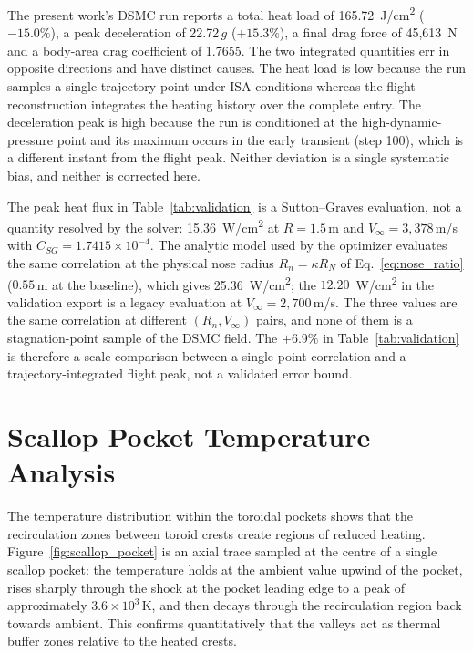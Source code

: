 The present work's DSMC run reports a total heat load of 165.72~J/cm\textsuperscript{2} ($-15.0\%$), a peak deceleration of 22.72\,$g$ ($+15.3\%$), a final drag force of 45{,}613~N and a body-area drag coefficient of 1.7655. The two integrated quantities err in opposite directions and have distinct causes. The heat load is low because the run samples a single trajectory point under ISA conditions whereas the flight reconstruction integrates the heating history over the complete entry. The deceleration peak is high because the run is conditioned at the high-dynamic-pressure point and its maximum occurs in the early transient (step 100), which is a different instant from the flight peak. Neither deviation is a single systematic bias, and neither is corrected here.

The peak heat flux in Table~\ref{tab:validation} is a Sutton--Graves evaluation, not a quantity resolved by the solver: 15.36~W/cm\textsuperscript{2} at $R=1.5$\,m and $V_{\infty}=3{,}378$\,m/s with $C_{SG}=1.7415\times10^{-4}$. The analytic model used by the optimizer evaluates the same correlation at the physical nose radius $R_n=\kappa R_N$ of Eq.~\eqref{eq:nose_ratio} ($0.55$\,m at the baseline), which gives 25.36~W/cm\textsuperscript{2}; the $12.20$~W/cm\textsuperscript{2} in the validation export is a legacy evaluation at $V_{\infty}=2{,}700$\,m/s. The three values are the same correlation at different $(R_n,V_{\infty})$ pairs, and none of them is a stagnation-point sample of the DSMC field. The $+6.9\%$ in Table~\ref{tab:validation} is therefore a scale comparison between a single-point correlation and a trajectory-integrated flight peak, not a validated error bound.

\section{Scallop Pocket Temperature Analysis}
The temperature distribution within the toroidal pockets shows that the recirculation zones between toroid crests create regions of reduced heating. Figure~\ref{fig:scallop_pocket} is an axial trace sampled at the centre of a single scallop pocket: the temperature holds at the ambient value upwind of the pocket, rises sharply through the shock at the pocket leading edge to a peak of approximately $3.6 \times 10^3$\,K, and then decays through the recirculation region back towards ambient. This confirms quantitatively that the valleys act as thermal buffer zones relative to the heated crests.

